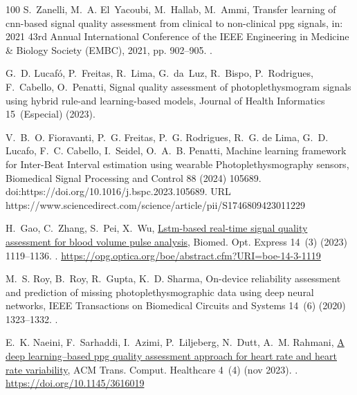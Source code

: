 \documentclass[final,3p,times,twocolumn]{elsarticle}
\begin{document}
\begin{thebibliography}{100}
S.~Zanelli, M.~A. El~Yacoubi, M.~Hallab, M.~Ammi, Transfer learning of
  cnn-based signal quality assessment from clinical to non-clinical ppg
  signals, in: 2021 43rd Annual International Conference of the IEEE
  Engineering in Medicine \& Biology Society (EMBC), 2021, pp. 902--905.
\newblock \href {https://doi.org/10.1109/EMBC46164.2021.9629640}
  {}.

G.~D. Lucaf{\'o}, P.~Freitas, R.~Lima, G.~da~Luz, R.~Bispo, P.~Rodrigues,
  F.~Cabello, O.~Penatti, Signal quality assessment of photoplethysmogram
  signals using hybrid rule-and learning-based models, Journal of Health
  Informatics 15~(Especial) (2023).

V.~B.~O. Fioravanti, P.~G. Freitas, P.~G. Rodrigues, R.~G. de Lima, G.~D. Lucafo, F.~C. Cabello, I.~Seidel, O.~A.~B. Penatti,
Machine learning framework for Inter-Beat Interval estimation using wearable Photoplethysmography sensors,
Biomedical Signal Processing and Control 88 (2024) 105689.
doi:https://doi.org/10.1016/j.bspc.2023.105689.
URL https://www.sciencedirect.com/science/article/pii/S1746809423011229

H.~Gao, C.~Zhang, S.~Pei, X.~Wu,
  \href{https://opg.optica.org/boe/abstract.cfm?URI=boe-14-3-1119}{Lstm-based
  real-time signal quality assessment for blood volume pulse analysis}, Biomed.
  Opt. Express 14~(3) (2023) 1119--1136.
\newblock \href {https://doi.org/10.1364/BOE.477143}
  {}.
\newline\urlprefix\url{https://opg.optica.org/boe/abstract.cfm?URI=boe-14-3-1119}

M.~S. Roy, B.~Roy, R.~Gupta, K.~D. Sharma, On-device reliability assessment and
  prediction of missing photoplethysmographic data using deep neural networks,
  IEEE Transactions on Biomedical Circuits and Systems 14~(6) (2020)
  1323--1332.
\newblock \href {https://doi.org/10.1109/TBCAS.2020.3028935}
  {}.

E.~K. Naeini, F.~Sarhaddi, I.~Azimi, P.~Liljeberg, N.~Dutt, A.~M. Rahmani,
  \href{https://doi.org/10.1145/3616019}{A deep learning–based ppg quality
  assessment approach for heart rate and heart rate variability}, ACM Trans.
  Comput. Healthcare 4~(4) (nov 2023).
\newblock \href {https://doi.org/10.1145/3616019} {}.
\newline\urlprefix\url{https://doi.org/10.1145/3616019}


\end{thebibliography}
\end{document}
